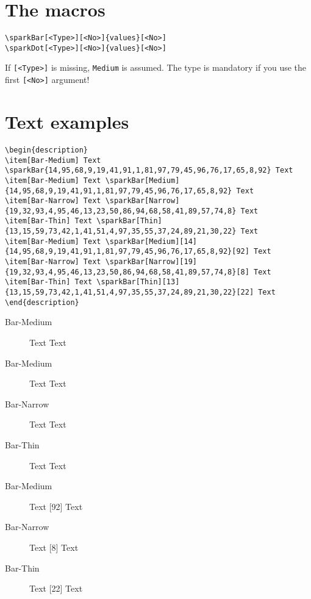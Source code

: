 \documentclass[11pt]{article}
\begin{document}
\normalsize

\section{The macros}

\begin{verbatim}
\sparkBar[<Type>][<No>]{values}[<No>]
\sparkDot[<Type>][<No>]{values}[<No>]
\end{verbatim}

If \texttt{[<Type>]} is missing, \texttt{Medium} is assumed. The type is mandatory if you use
the first \texttt{[<No>]} argument!



\section{Text examples}

\footnotesize
\begin{verbatim}
\begin{description}
\item[Bar-Medium] Text \sparkBar{14,95,68,9,19,41,91,1,81,97,79,45,96,76,17,65,8,92} Text
\item[Bar-Medium] Text \sparkBar[Medium]{14,95,68,9,19,41,91,1,81,97,79,45,96,76,17,65,8,92} Text
\item[Bar-Narrow] Text \sparkBar[Narrow]{19,32,93,4,95,46,13,23,50,86,94,68,58,41,89,57,74,8} Text
\item[Bar-Thin] Text \sparkBar[Thin]{13,15,59,73,42,1,41,51,4,97,35,55,37,24,89,21,30,22} Text
\item[Bar-Medium] Text \sparkBar[Medium][14]{14,95,68,9,19,41,91,1,81,97,79,45,96,76,17,65,8,92}[92] Text
\item[Bar-Narrow] Text \sparkBar[Narrow][19]{19,32,93,4,95,46,13,23,50,86,94,68,58,41,89,57,74,8}[8] Text
\item[Bar-Thin] Text \sparkBar[Thin][13]{13,15,59,73,42,1,41,51,4,97,35,55,37,24,89,21,30,22}[22] Text
\end{description}
\end{verbatim}

\normalsize
\begin{description}
\item[Bar-Medium] Text  Text
\item[Bar-Medium] Text  Text
\item[Bar-Narrow] Text  Text
\item[Bar-Thin] Text  Text
\item[Bar-Medium] Text [92] Text
\item[Bar-Narrow] Text [8] Text
\item[Bar-Thin] Text [22] Text
\end{description}
\end{document}

